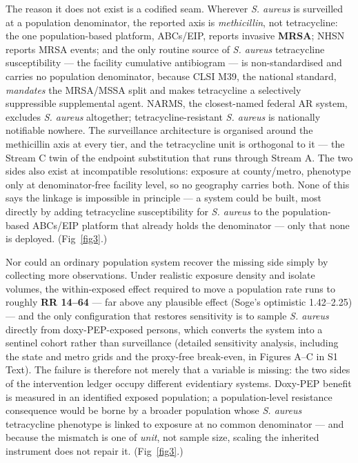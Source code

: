 \documentclass[10pt,letterpaper]{article}
\begin{document}
The reason it does not exist is a codified seam. Wherever \emph{S.
aureus} is surveilled at a population denominator, the reported axis is
\emph{methicillin}, not tetracycline: the one population-based platform,
ABCs/EIP, reports invasive \textbf{MRSA}; NHSN reports MRSA events; and
the only routine source of \emph{S. aureus} tetracycline susceptibility
--- the facility cumulative antibiogram --- is non-standardised and
carries no population denominator, because CLSI M39, the national
standard, \emph{mandates} the MRSA/MSSA split and makes tetracycline a
selectively suppressible supplemental agent. NARMS, the closest-named
federal AR system, excludes \emph{S. aureus} altogether;
tetracycline-resistant \emph{S. aureus} is nationally notifiable
nowhere. The surveillance architecture is organised around the
methicillin axis at every tier, and the tetracycline unit is orthogonal
to it --- the Stream C twin of the endpoint substitution that runs
through Stream A. The two sides also exist at incompatible resolutions:
exposure at county/metro, phenotype only at denominator-free facility
level, so no geography carries both. None of this says the linkage is
impossible in principle --- a system could be built, most directly by
adding tetracycline susceptibility for \emph{S. aureus} to the
population-based ABCs/EIP platform that already holds the denominator
--- only that none is deployed. (Fig~\ref{fig3}.)

Nor could an ordinary population system recover the missing side simply
by collecting more observations. Under realistic exposure density and
isolate volumes, the within-exposed effect required to move a population
rate runs to roughly \textbf{RR 14--64} --- far above any plausible
effect (Soge's optimistic 1.42--2.25) --- and the only configuration
that restores sensitivity is to sample \emph{S. aureus} directly from
doxy-PEP-exposed persons, which converts the system into a sentinel
cohort rather than surveillance (detailed sensitivity analysis,
including the state and metro grids and the proxy-free break-even, in
Figures A--C in S1 Text). The failure is
therefore not merely that a variable is missing: the two sides of the
intervention ledger occupy different evidentiary systems. Doxy-PEP
benefit is measured in an identified exposed population; a
population-level resistance consequence would be borne by a broader
population whose \emph{S. aureus} tetracycline phenotype is linked to
exposure at no common denominator --- and because the mismatch is one of
\emph{unit}, not sample size, scaling the inherited instrument does not repair it. (Fig~\ref{fig3}.)
\end{document}
